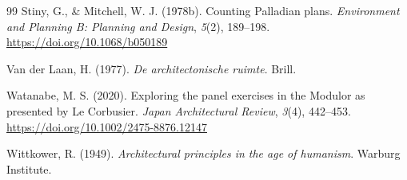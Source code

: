 \documentclass[10pt,twocolumn]{article}
\begin{document}
\begin{thebibliography}{99}
Stiny, G., \& Mitchell, W. J. (1978b). Counting Palladian plans. \emph{Environment and Planning B: Planning and Design}, \emph{5}(2), 189--198. \url{https://doi.org/10.1068/b050189}

Van der Laan, H. (1977). \emph{De architectonische ruimte}. Brill.

Watanabe, M. S. (2020). Exploring the panel exercises in the Modulor as presented by Le Corbusier. \emph{Japan Architectural Review}, \emph{3}(4), 442--453. \url{https://doi.org/10.1002/2475-8876.12147}

Wittkower, R. (1949). \emph{Architectural principles in the age of humanism}. Warburg Institute.

\end{thebibliography}
\end{document}
